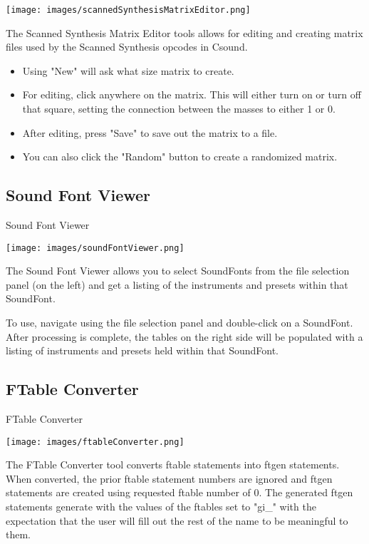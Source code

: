 \texttt{[image: images/scannedSynthesisMatrixEditor.png]}

The Scanned Synthesis Matrix Editor tools allows for editing and
creating matrix files used by the Scanned Synthesis opcodes in Csound.

\begin{itemize}
\tightlist
\item
  Using "New" will ask what size matrix to create.
\item
  For editing, click anywhere on the matrix. This will either turn on or
  turn off that square, setting the connection between the masses to
  either 1 or 0.
\item
  After editing, press "Save" to save out the matrix to a file.
\item
  You can also click the "Random" button to create a randomized matrix.
\end{itemize}

\subsection{Sound Font Viewer}\label{soundFontViewer}

Sound Font Viewer

\texttt{[image: images/soundFontViewer.png]}

The Sound Font Viewer allows you to select SoundFonts from the file
selection panel (on the left) and get a listing of the instruments and
presets within that SoundFont.

To use, navigate using the file selection panel and double-click on a
SoundFont. After processing is complete, the tables on the right side
will be populated with a listing of instruments and presets held within
that SoundFont.

\subsection{FTable Converter}\label{ftableConverter}

FTable Converter

\texttt{[image: images/ftableConverter.png]}

The FTable Converter tool converts ftable statements into ftgen
statements. When converted, the prior ftable statement numbers are
ignored and ftgen statements are created using requested ftable number
of 0. The generated ftgen statements generate with the values of the
ftables set to "gi\_" with the expectation that the user will fill out
the rest of the name to be meaningful to them.

